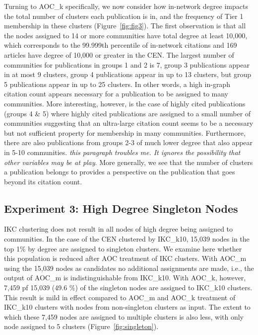 \documentclass[12pt, oneside]{article}   	%
\begin{document}
Turning to AOC\_k specifically, we now consider how in-network degree impacts the total number of clusters each publication is in, and the frequency of Tier 1 membership in these clusters (Figure~\ref{fig:fig3}). The first observation is that all the nodes assigned to 14 or more communities have total degree at least 10,000, which corresponds to the 99.999th percentile of in-network citations and 169 articles have degree of 10,000 or greater in the CEN. The largest number of communities for publications in groups 1 and 2 is 7, group 3 publications appear in at most 9 clusters, group 4 publications appear in up to 13 clusters, but group 5 publications appear in up to 25 clusters. In other words, a high in-graph citation count appears necessary  for a publication to be assigned to many communities. More interesting, however, is the case of highly cited publications (groups 4 \& 5) where highly cited publications are assigned to a small number of communities suggesting that  an ultra-large citation count seems to be a necessary but not sufficient property for membership in many communities. Furthermore, there are also publications from groups 2-3 of much lower degree that also appear in 5-10 communities. \emph{this paragraph troubles me. It ignores the possibility that other variables may be at play}. More generally, we see that the number of clusters a publication belongs to provides a perspective on the publication that goes beyond its citation count.
 
\subsection{Experiment 3: High Degree Singleton Nodes} 
 
IKC clustering does not result in all nodes of high degree being assigned to communities. In the case of the CEN clustered by IKC\_k10, 15,039 nodes in the top 1\% by degree are assigned to singleton clusters. We examine here whether this population is reduced after AOC treatment of IKC clusters. With AOC\_m using the 15,039 nodes as candidates no additional assignments are made, i.e., the output of AOC\_m is indistinguishable from IKC\_k10. With AOC\_k, however, 7,459 pf 15,039 (49.6 \%) of the singleton nodes are assigned to IKC\_k10 clusters. This result is mild in effect compared to AOC\_m and AOC\_k treatment of IKC\_k10 clusters with nodes from non-singleton clusters as input. The extent to which these 7,459 nodes are assigned to multiple clusters is also less, with only node assigned to 5 clusters (Figure~\ref{fig:singleton}). 
\end{document}
